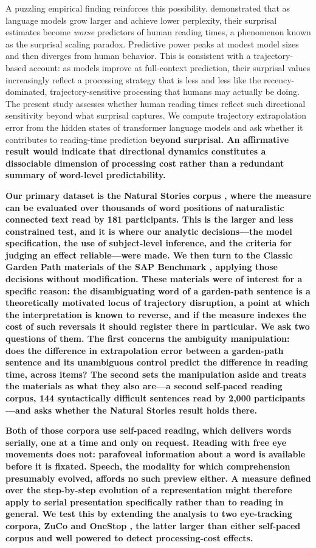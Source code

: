 \documentclass[12pt]{article}
\newcommand{\new}[1]{{\bfseries #1}}
\begin{document}
A puzzling empirical finding reinforces this possibility. \citet{oh2023b} demonstrated that as language models grow larger and achieve lower perplexity, their surprisal estimates become \textit{worse} predictors of human reading times, a phenomenon known as the surprisal scaling paradox. Predictive power peaks at modest model sizes and then diverges from human behavior. This is consistent with a trajectory-based account: as models improve at full-context prediction, their surprisal values increasingly reflect a processing strategy that is less and less like the recency-dominated, trajectory-sensitive processing that humans may actually be doing.
The present study assesses whether human reading times reflect such directional sensitivity beyond what surprisal captures. We compute trajectory extrapolation error from the hidden states of transformer language models and ask whether it contributes to reading-time prediction \new{beyond surprisal. An affirmative result would indicate that directional dynamics constitutes a dissociable dimension of processing cost rather than a redundant summary of word-level predictability.}

\new{Our primary dataset is the Natural Stories corpus \citep{futrell2018}, where the measure can be evaluated over thousands of word positions of naturalistic connected text read by 181 participants. This is the larger and less constrained test, and it is where our analytic decisions---the model specification, the use of subject-level inference, and the criteria for judging an effect reliable---were made. We then turn to the Classic Garden Path materials of the SAP Benchmark \citep{huang2024}, applying those decisions without modification. These materials were of interest for a specific reason: the disambiguating word of a garden-path sentence is a theoretically motivated locus of trajectory disruption, a point at which the interpretation is known to reverse, and if the measure indexes the cost of such reversals it should register there in particular. We ask two questions of them. The first concerns the ambiguity manipulation: does the difference in extrapolation error between a garden-path sentence and its unambiguous control predict the difference in reading time, across items? The second sets the manipulation aside and treats the materials as what they also are---a second self-paced reading corpus, 144 syntactically difficult sentences read by 2,000 participants---and asks whether the Natural Stories result holds there.}

\new{Both of those corpora use self-paced reading, which delivers words serially, one at a time and only on request. Reading with free eye movements does not: parafoveal information about a word is available before it is fixated. Speech, the modality for which comprehension presumably evolved, affords no such preview either. A measure defined over the step-by-step evolution of a representation might therefore apply to serial presentation specifically rather than to reading in general. We test this by extending the analysis to two eye-tracking corpora, ZuCo \citep{hollenstein2018} and OneStop \citep{berzak2025}, the latter larger than either self-paced corpus and well powered to detect processing-cost effects.}
\end{document}
